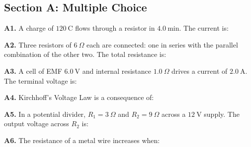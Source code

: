 \newpage
\begin{exercisebox}[23]

\subsection*{Section A: Multiple Choice}

\textbf{A1.} A charge of $120\ \text{C}$ flows
through a resistor in $4.0\ \text{min}$. The
current is:


\vspace{0.4cm}

\textbf{A2.} Three resistors of $6\ \Omega$ each
are connected: one in series with the parallel
combination of the other two. The total resistance is:


\vspace{0.4cm}

\textbf{A3.} A cell of EMF $6.0\ \text{V}$ and
internal resistance $1.0\ \Omega$ drives a current
of $2.0\ \text{A}$. The terminal voltage is:


\vspace{0.4cm}

\textbf{A4.} Kirchhoff's Voltage Law is a
consequence of:


\vspace{0.4cm}

\textbf{A5.} In a potential divider, $R_1 = 3\ \Omega$
and $R_2 = 9\ \Omega$ across a $12\ \text{V}$ supply.
The output voltage across $R_2$ is:


\vspace{0.4cm}

\textbf{A6.} The resistance of a metal wire
increases when:


\end{exercisebox}
